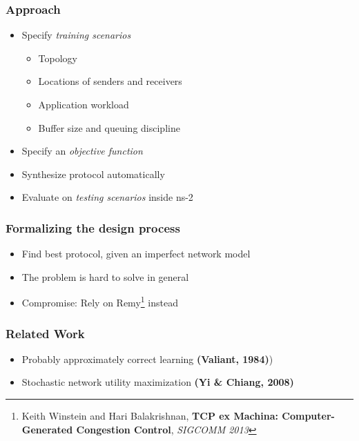 \documentclass[svgnames]{beamer}
\begin{document}
\begin{Large}
\begin{frame}
\frametitle{Approach}
\begin{itemize}
\item Specify \textit{training scenarios}
\begin{itemize}
\item Topology
\item Locations of senders and receivers
\item Application workload
\item Buffer size and queuing discipline 
\end{itemize}
\item Specify an \textit{objective function}
\item Synthesize protocol automatically
\item Evaluate on \textit{testing scenarios} inside ns-2
\end{itemize}
\end{frame}

\begin{frame}
\frametitle{Formalizing the design process}
\begin{itemize}
\item Find best protocol, given an imperfect network model
\item The problem is hard to solve in general
\item<2-> Compromise: Rely on Remy\footnote<2->{Keith Winstein and Hari Balakrishnan, \textbf{TCP ex Machina: Computer-Generated Congestion Control}, \textit{SIGCOMM 2013}} instead
\end{itemize}
\end{frame}













\begin{frame}
\frametitle{Related Work}
\begin{itemize}
\item Probably approximately correct learning \textbf{(Valiant, 1984)})
\item Stochastic network utility maximization \textbf{(Yi \& Chiang, 2008)}
\end{itemize}
\end{frame}


\end{Large}
\end{document}
